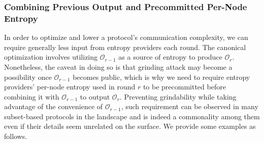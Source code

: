 \documentclass[letterpaper,twocolumn,10pt]{article}
\theoremstyle{definition}
\theoremstyle{remark}
\begin{document}
\subsubsection{Combining Previous Output and Precommitted Per-Node Entropy}
\label{subsubsection:precommitted}
In order to optimize and lower a protocol's communication complexity, we can require generally less input from entropy providers each round. The canonical optimization involves utilizing $\mathcal{O}_{r - 1}$ as a source of entropy to produce $\mathcal{O}_{r}$. Nonetheless, the caveat in doing so is that grinding attack may become a possibility once $\mathcal{O}_{r - 1}$ becomes public, which is why we need to require entropy providers' per-node entropy used in round $r$ to be precommitted before combining it with $\mathcal{O}_{r - 1}$ to output $\mathcal{O}_r$. Preventing grindability while taking advantage of the convenience of $\mathcal{O}_{r - 1}$, such requirement can be observed in many subset-based protocols in the landscape and is indeed a commonality among them even if their details seem unrelated on the surface. We provide some examples as follows.
\end{document}
